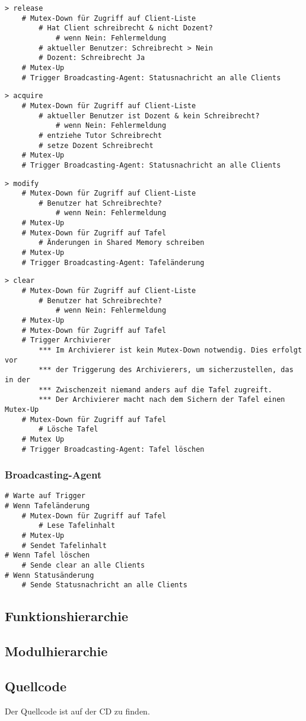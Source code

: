 \begin{lstlisting}
> release
    # Mutex-Down für Zugriff auf Client-Liste
        # Hat Client schreibrecht & nicht Dozent?
            # wenn Nein: Fehlermeldung
        # aktueller Benutzer: Schreibrecht > Nein
        # Dozent: Schreibrecht Ja
    # Mutex-Up
    # Trigger Broadcasting-Agent: Statusnachricht an alle Clients
\end{lstlisting}
\begin{lstlisting}
> acquire
    # Mutex-Down für Zugriff auf Client-Liste
        # aktueller Benutzer ist Dozent & kein Schreibrecht?
            # wenn Nein: Fehlermeldung
        # entziehe Tutor Schreibrecht
        # setze Dozent Schreibrecht
    # Mutex-Up
    # Trigger Broadcasting-Agent: Statusnachricht an alle Clients
\end{lstlisting}
\begin{lstlisting}
> modify
    # Mutex-Down für Zugriff auf Client-Liste
        # Benutzer hat Schreibrechte?
            # wenn Nein: Fehlermeldung
    # Mutex-Up
    # Mutex-Down für Zugriff auf Tafel
        # Änderungen in Shared Memory schreiben
    # Mutex-Up
    # Trigger Broadcasting-Agent: Tafeländerung
\end{lstlisting}
\begin{lstlisting}
> clear
    # Mutex-Down für Zugriff auf Client-Liste
        # Benutzer hat Schreibrechte?
            # wenn Nein: Fehlermeldung
    # Mutex-Up
    # Mutex-Down für Zugriff auf Tafel
    # Trigger Archivierer
        *** Im Archivierer ist kein Mutex-Down notwendig. Dies erfolgt vor
        *** der Triggerung des Archivierers, um sicherzustellen, das in der
        *** Zwischenzeit niemand anders auf die Tafel zugreift.
        *** Der Archivierer macht nach dem Sichern der Tafel einen Mutex-Up
    # Mutex-Down für Zugriff auf Tafel
        # Lösche Tafel  
    # Mutex Up
    # Trigger Broadcasting-Agent: Tafel löschen
\end{lstlisting}

\subsubsection{Broadcasting-Agent}
\begin{lstlisting}
# Warte auf Trigger
# Wenn Tafeländerung
    # Mutex-Down für Zugriff auf Tafel
        # Lese Tafelinhalt
    # Mutex-Up
	# Sendet Tafelinhalt
# Wenn Tafel löschen
	# Sende clear an alle Clients
# Wenn Statusänderung
	# Sende Statusnachricht an alle Clients
\end{lstlisting}

\subsection{Funktionshierarchie}

\subsection{Modulhierarchie}

\subsection{Quellcode}
Der Quellcode ist auf der CD zu finden.